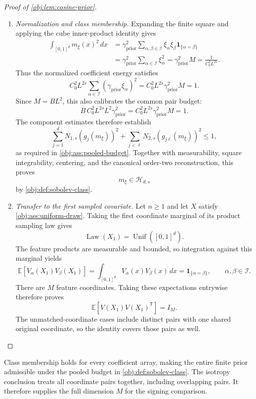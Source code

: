 \documentclass[11pt]{article}
\begin{document}
\begin{proof}[Proof of \cref{obj:lem:cosine-prior}]
\begin{enumerate}
\item \emph{Normalization and class membership.}
Expanding the finite square and applying the cube inner-product identity
gives
\[
\begin{aligned}
\int_{[0,1]^d}m_\xi(x)^2\,dx
&=\gamma_{\mathrm{prior}}^2
 \sum_{\alpha,\beta\in\mathcal I}
 \xi_\alpha\xi_\beta\mathbf1_{\{\alpha=\beta\}}\\
&=\gamma_{\mathrm{prior}}^2
 \sum_{\alpha\in\mathcal I}\xi_\alpha^2
=\gamma_{\mathrm{prior}}^2M
=\frac{1}{C_0^2L^{2s}}.
\end{aligned}
\]
Thus the normalized coefficient energy satisfies
\[
C_0^2L^{2s}
 \sum_{\alpha\in\mathcal I}
  (\gamma_{\mathrm{prior}}\xi_\alpha)^2
=C_0^2L^{2s}\gamma_{\mathrm{prior}}^2M
=1.
\]
Since \(M=BL^2\), this also calibrates the common pair budget:
\[
B\,C_0^2L^{2s}L^2\gamma_{\mathrm{prior}}^2
=C_0^2L^{2s}\gamma_{\mathrm{prior}}^2M
=1.
\]
The component estimates therefore establish
\[
\sum_{j=1}^dN_{1,s}(g_j(m_\xi))^2
+\sum_{j<\ell}N_{2,s}(g_{j\ell}(m_\xi))^2
\leq1,
\]
as required in \cref{obj:ass:pooled-budget}. Together with measurability,
square integrability, centering, and the canonical order-two
reconstruction, this proves
\[
m_\xi\in\mathcal H_{d,s}
\]
by \cref{obj:def:sobolev-class}.

\item \emph{Transfer to the first sampled covariate.}
Let \(n\geq1\) and let \(X\) satisfy \cref{obj:ass:uniform-draw}.
Taking the first coordinate marginal of its product sampling law gives
\[
\operatorname{Law}(X_1)=\operatorname{Unif}([0,1]^d).
\]
The feature products are measurable and bounded, so integration against
this marginal yields
\[
\mathbb E[V_\alpha(X_1)V_\beta(X_1)]
=\int_{[0,1]^d}V_\alpha(x)V_\beta(x)\,dx
=\mathbf1_{\{\alpha=\beta\}},
\qquad \alpha,\beta\in\mathcal I.
\]
There are \(M\) feature coordinates. Taking these expectations entrywise
therefore proves
\[
\mathbb E[V(X_1)V(X_1)^{\mathsf T}]=I_M.
\]
The unmatched-coordinate cases include distinct pairs with one shared
original coordinate, so the identity covers those pairs as well.
\end{enumerate}
\end{proof}

Class membership holds for every coefficient array, making the entire finite prior admissible under the pooled budget in \cref{obj:def:sobolev-class}. The isotropy conclusion treats all coordinate pairs together, including overlapping pairs. It therefore supplies the full dimension \(M\) for the signing comparison.
\end{document}
